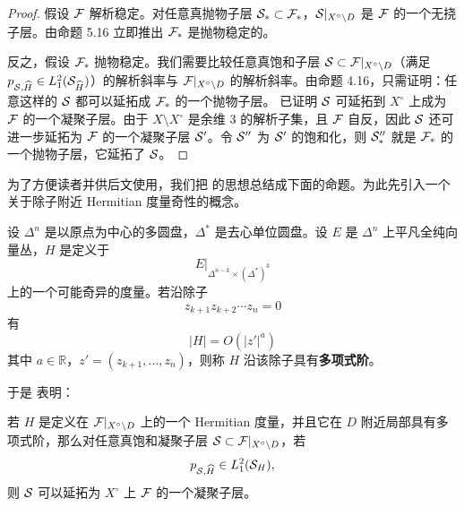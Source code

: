 \begin{proof}
假设 \(\mathcal{F}\) 解析稳定。对任意真抛物子层 \(\mathcal{S}_*\subset \mathcal{F}_*\)，\(\mathcal{S}|_{X^\circ\setminus D}\) 是 \(\mathcal{F}\) 的一个无挠子层。由命题 5.16 立即推出 \(\mathcal{F}_*\) 是抛物稳定的。

反之，假设 \(\mathcal{F}_*\) 抛物稳定。我们需要比较任意真饱和子层 \(\mathcal{S}\subset \mathcal{F}|_{X^\circ\setminus D}\)（满足 \(p_{\mathcal{S},\widehat{H}}\in L_1^2(\mathcal{S}_{\widehat{H}})\)）的解析斜率与 \(\mathcal{F}|_{X^\circ\setminus D}\) 的解析斜率。由命题 4.16，只需证明：任意这样的 \(\mathcal{S}\) 都可以延拓成 \(\mathcal{F}_*\) 的一个抛物子层。\cite[Proposition 5.9]{Li} 已证明 \(\mathcal{S}\) 可延拓到 \(X^\circ\) 上成为 \(\mathcal{F}\) 的一个凝聚子层。由于 \(X\setminus X^\circ\) 是余维 3 的解析子集，且 \(\mathcal{F}\) 自反，因此 \(\mathcal{S}\) 还可进一步延拓为 \(\mathcal{F}\) 的一个凝聚子层 \(\mathcal{S}'\)。令 \(\mathcal{S}''\) 为 \(\mathcal{S}'\) 的饱和化，则 \(\mathcal{S}''_*\) 就是 \(\mathcal{F}_*\) 的一个抛物子层，它延拓了 \(\mathcal{S}\)。
\end{proof}

为了方便读者并供后文使用，我们把 \cite[Proposition 5.9]{Li} 的思想总结成下面的命题。为此先引入一个关于除子附近 Hermitian 度量奇性的概念。

\begin{definition}
设 \(\Delta^n\) 是以原点为中心的多圆盘，\(\Delta^*\) 是去心单位圆盘。设 \(E\) 是 \(\Delta^n\) 上平凡全纯向量丛，\(H\) 是定义于
\[
E|_{\Delta^{n-k}\times (\Delta^*)^k}
\]
上的一个可能奇异的度量。若沿除子
\[
z_{k+1}z_{k+2}\cdots z_n=0
\]
有
\[
|H|=O(|z'|^a)
\]
其中 \(a\in\mathbb R\)，\(z'=(z_{k+1},\dots,z_n)\)，则称 \(H\) 沿该除子具有\textbf{多项式阶}。
\end{definition}

于是 \cite[Proposition 5.9]{Li} 表明：

\begin{proposition}
若 \(H\) 是定义在 \(\mathcal{F}|_{X^\circ\setminus D}\) 上的一个 Hermitian 度量，并且它在 \(D\) 附近局部具有多项式阶，那么对任意真饱和凝聚子层 \(\mathcal{S}\subset \mathcal{F}|_{X^\circ\setminus D}\)，若
\[
p_{\mathcal{S},\widehat{H}}\in L_1^2(\mathcal{S}_H),
\]
则 \(\mathcal{S}\) 可以延拓为 \(X^\circ\) 上 \(\mathcal{F}\) 的一个凝聚子层。
\end{proposition}
